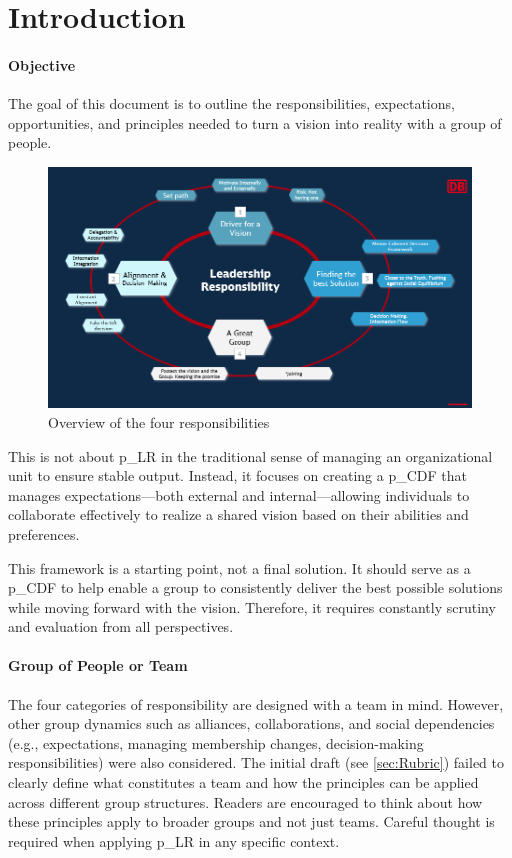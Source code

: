 \pagebreak


\section{Introduction}

\paragraph{Objective}
The goal of this document is to outline the responsibilities, expectations, opportunities, and principles needed to turn a vision into reality with a group of people.

\begin{figure}[H]
	\centering
	\includegraphics[scale=0.5]{attachment/chapter_OWN/Rubric_LR_Overview}
	\caption{Overview of the four responsibilities}
\end{figure}

This is not about \gls{p_LR} in the traditional sense of managing an organizational unit to ensure stable output. Instead, it focuses on creating a \gls{p_CDF} that manages expectations—both external and internal—allowing individuals to collaborate effectively to realize a shared vision based on their abilities and preferences.

This framework is a starting point, not a final solution. It should serve as a \gls{p_CDF} to help enable a group to consistently deliver the best possible solutions while moving forward with the vision. Therefore, it requires constantly scrutiny and evaluation from all perspectives.


\paragraph{Group of People or Team}
The four categories of responsibility are designed with a team in mind. However, other group dynamics such as alliances, collaborations, and social dependencies (e.g., expectations, managing membership changes, decision-making responsibilities) were also considered. The initial draft (see \ref{sec:Rubric}) failed to clearly define what constitutes a team and how the principles can be applied across different group structures. Readers are encouraged to think about how these principles apply to broader groups and not just teams. Careful thought is required when applying \gls{p_LR} in any specific context.

